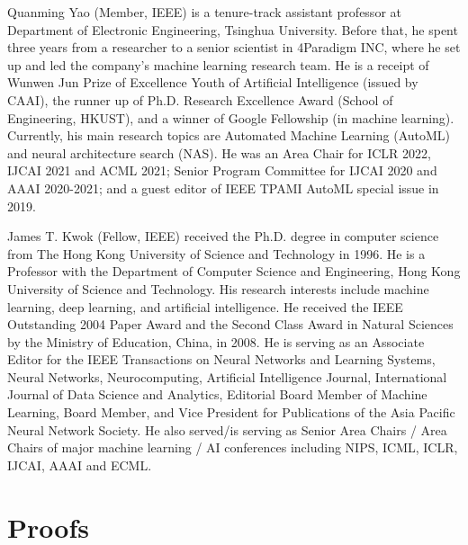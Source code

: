 \documentclass[10pt,journal,compsoc]{IEEEtran}
\begin{document}
\begin{IEEEbiography}{Quanming Yao} (Member, IEEE)
is a tenure-track assistant professor at Department of Electronic Engineering, Tsinghua University. Before that, he spent three years from a researcher to a senior scientist in 4Paradigm INC, where he set up and led the company's machine learning research team.  He is a receipt of Wunwen Jun Prize of Excellence Youth of Artificial Intelligence (issued by CAAI), the runner up of Ph.D. Research Excellence Award (School of Engineering, HKUST), and a winner of Google Fellowship (in machine learning).
Currently,
his main research topics are Automated Machine Learning (AutoML) and neural architecture search (NAS).
He was an Area Chair for ICLR 2022, IJCAI 2021 and ACML 2021; 
Senior Program Committee for IJCAI 2020 and AAAI 2020-2021; and a guest editor of IEEE TPAMI AutoML special issue in 2019.
\end{IEEEbiography}



\begin{IEEEbiography}{James T. Kwok} (Fellow, IEEE)
	received the Ph.D. degree in computer science from The Hong Kong University of Science and Technology in 1996. 
	He is a Professor with the Department of Computer Science and Engineering, Hong Kong
	University of Science and Technology. His research interests include machine
	learning, deep learning, and artificial intelligence. He received the
	IEEE Outstanding 2004 Paper Award and the Second Class Award in Natural Sciences by
	the Ministry of Education, China, in 2008. 
	He is serving as an Associate Editor for the IEEE Transactions on Neural Networks and Learning Systems, Neural Networks, Neurocomputing, Artificial Intelligence Journal, International Journal of Data Science and Analytics, Editorial Board Member of Machine Learning,
	Board Member, and Vice President for Publications of the Asia Pacific Neural Network
	Society. He also served/is serving as Senior Area Chairs / Area Chairs of major machine learning /
	AI conferences including NIPS, ICML, ICLR, IJCAI, AAAI and ECML.
\end{IEEEbiography}

\cleardoublepage
\appendices


\section{Proofs}
\label{app:proof}
\end{document}
